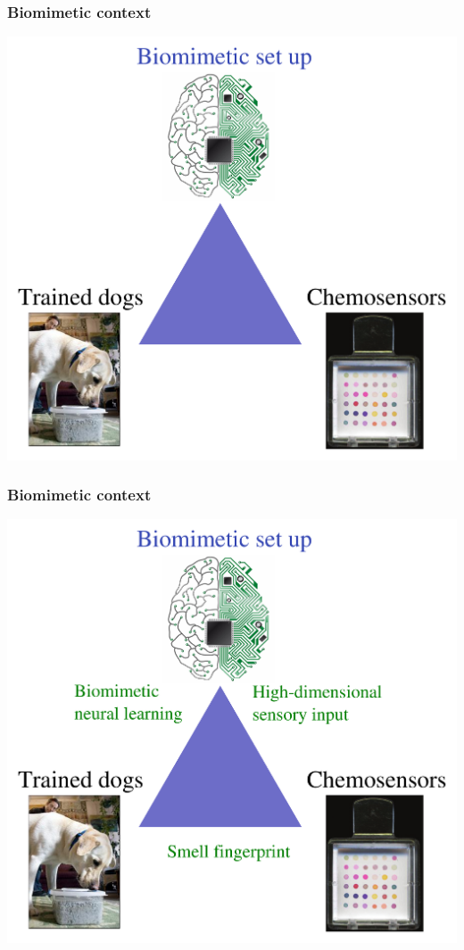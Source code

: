 \documentclass{beamer}              %
\begin{document}

\begin{frame}
\frametitle{Biomimetic context}

\begin{center}
  \includegraphics[width=.7\linewidth]{figures/biomimetic-triangle.pdf}
\end{center}
\end{frame}

\begin{frame}
\frametitle{Biomimetic context}

\begin{center}
  \includegraphics[width=.7\linewidth]{figures/biomimetic-triangle-2.pdf}
\end{center}
\end{frame}
\end{document}
